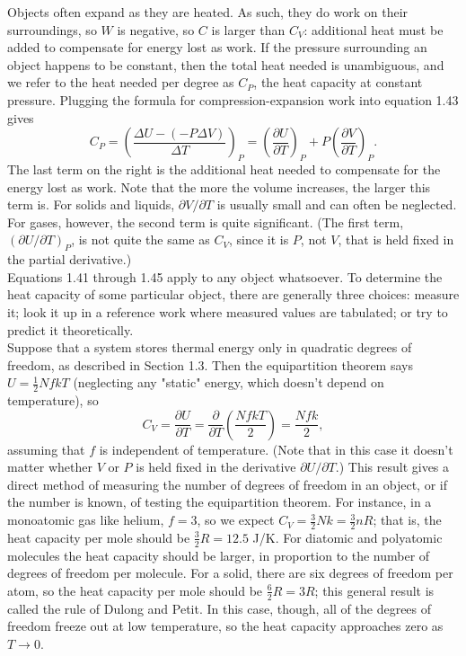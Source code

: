 \documentclass[11pt]{exam}
\begin{document}
\hspace*{10mm}Objects often expand as they are heated. As such, they do work on their surroundings, so $W$ is negative, so $C$ is larger than $C_V$: additional heat must be added to compensate for energy lost as work. If the pressure surrounding an object happens to be constant, then the total heat needed is unambiguous, and we refer to the heat needed per degree as $C_P$, the heat capacity at constant pressure. Plugging the formula for compression-expansion work into equation 1.43 gives
\begin{equation}\tag{1.45}
    C_P = \left(\frac{\Delta U - (-P\Delta V)}{\Delta T}\right)_P = \left(\frac{\partial U}{\partial T}\right)_P + P\left(\frac{\partial V}{\partial T}\right)_P.
\end{equation}
The last term on the right is the additional heat needed to compensate for the energy lost as work. Note that the more the volume increases, the larger this term is. For solids and liquids, $\partial V/\partial T$ is usually small and can often be neglected. For gases, however, the second term is quite significant. (The first term, $(\partial U/\partial T)_P$, is not quite the same as $C_V$, since it is $P$, not $V$, that is held fixed in the partial derivative.)\\
\hspace*{10mm}Equations 1.41 through 1.45 apply to any object whatsoever. To determine the heat capacity of some particular object, there are generally three choices: measure it; look it up in a reference work where measured values are tabulated; or try to predict it theoretically. \\
\hspace*{10mm}Suppose that a system stores thermal energy only in quadratic degrees of freedom, as described in Section 1.3. Then the equipartition theorem says $U=\frac{1}{2}NfkT$ (neglecting any "static" energy, which doesn't depend on temperature), so 
\begin{equation}\tag{1.46}
C_V = \frac{\partial U}{\partial T} = \frac{\partial}{\partial T}\left(\frac{NfkT}{2}\right) = \frac{Nfk}{2},     
\end{equation}
assuming that $f$ is independent of temperature. (Note that in this case it doesn't matter whether $V$ or $P$ is held fixed in the derivative $\partial U/\partial T$.) This result gives a direct method of measuring the number of degrees of freedom in an object, or if the number is known, of testing the equipartition theorem. For instance, in a monoatomic gas like helium, $f=3$, so we expect $C_V=\frac{3}{2}Nk = \frac{3}{2}nR$; that is, the heat capacity per mole should be $\frac{3}{2}R=12.5$ J/K. For diatomic and polyatomic molecules the heat capacity should be larger, in proportion to the number of degrees of freedom per molecule. For a solid, there are six degrees of freedom per atom, so the heat capacity per mole should be $\frac{6}{2}R=3R$; this general result is called the rule of Dulong and Petit. In this case, though, all of the degrees of freedom freeze out at low temperature, so the heat capacity approaches zero as $T\rightarrow 0$.\\
\end{document}
